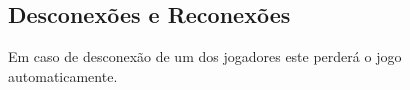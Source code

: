 \subsection{Desconexões e Reconexões}

Em caso de desconexão de um dos jogadores este perderá o jogo automaticamente.